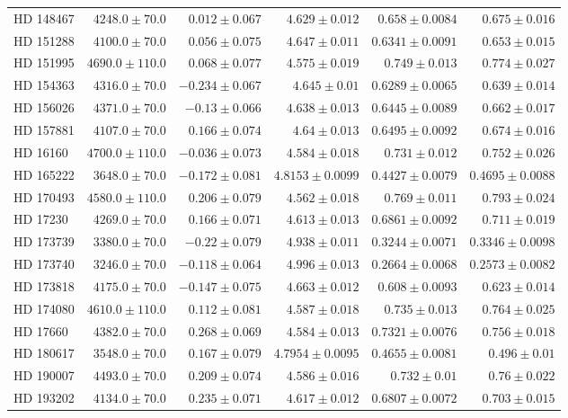 \begin{longtable*}{lrrrrr}
HD 148467 & $4248.0\pm 70.0$ & $0.012\pm 0.067$ & $4.629\pm 0.012$ & $0.658\pm 0.0084$ & $0.675\pm 0.016$ \\ 
HD 151288 & $4100.0\pm 70.0$ & $0.056\pm 0.075$ & $4.647\pm 0.011$ & $0.6341\pm 0.0091$ & $0.653\pm 0.015$ \\ 
HD 151995 & $4690.0\pm 110.0$ & $0.068\pm 0.077$ & $4.575\pm 0.019$ & $0.749\pm 0.013$ & $0.774\pm 0.027$ \\ 
HD 154363 & $4316.0\pm 70.0$ & $-0.234\pm 0.067$ & $4.645\pm 0.01$ & $0.6289\pm 0.0065$ & $0.639\pm 0.014$ \\ 
HD 156026 & $4371.0\pm 70.0$ & $-0.13\pm 0.066$ & $4.638\pm 0.013$ & $0.6445\pm 0.0089$ & $0.662\pm 0.017$ \\ 
HD 157881 & $4107.0\pm 70.0$ & $0.166\pm 0.074$ & $4.64\pm 0.013$ & $0.6495\pm 0.0092$ & $0.674\pm 0.016$ \\ 
HD 16160 & $4700.0\pm 110.0$ & $-0.036\pm 0.073$ & $4.584\pm 0.018$ & $0.731\pm 0.012$ & $0.752\pm 0.026$ \\ 
HD 165222 & $3648.0\pm 70.0$ & $-0.172\pm 0.081$ & $4.8153\pm 0.0099$ & $0.4427\pm 0.0079$ & $0.4695\pm 0.0088$ \\ 
HD 170493 & $4580.0\pm 110.0$ & $0.206\pm 0.079$ & $4.562\pm 0.018$ & $0.769\pm 0.011$ & $0.793\pm 0.024$ \\ 
HD 17230 & $4269.0\pm 70.0$ & $0.166\pm 0.071$ & $4.613\pm 0.013$ & $0.6861\pm 0.0092$ & $0.711\pm 0.019$ \\ 
HD 173739 & $3380.0\pm 70.0$ & $-0.22\pm 0.079$ & $4.938\pm 0.011$ & $0.3244\pm 0.0071$ & $0.3346\pm 0.0098$ \\ 
HD 173740 & $3246.0\pm 70.0$ & $-0.118\pm 0.064$ & $4.996\pm 0.013$ & $0.2664\pm 0.0068$ & $0.2573\pm 0.0082$ \\ 
HD 173818 & $4175.0\pm 70.0$ & $-0.147\pm 0.075$ & $4.663\pm 0.012$ & $0.608\pm 0.0093$ & $0.623\pm 0.014$ \\ 
HD 174080 & $4610.0\pm 110.0$ & $0.112\pm 0.081$ & $4.587\pm 0.018$ & $0.735\pm 0.013$ & $0.764\pm 0.025$ \\ 
HD 17660 & $4382.0\pm 70.0$ & $0.268\pm 0.069$ & $4.584\pm 0.013$ & $0.7321\pm 0.0076$ & $0.756\pm 0.018$ \\ 
HD 180617 & $3548.0\pm 70.0$ & $0.167\pm 0.079$ & $4.7954\pm 0.0095$ & $0.4655\pm 0.0081$ & $0.496\pm 0.01$ \\ 
HD 190007 & $4493.0\pm 70.0$ & $0.209\pm 0.074$ & $4.586\pm 0.016$ & $0.732\pm 0.01$ & $0.76\pm 0.022$ \\ 
HD 193202 & $4134.0\pm 70.0$ & $0.235\pm 0.071$ & $4.617\pm 0.012$ & $0.6807\pm 0.0072$ & $0.703\pm 0.015$ \\ 

\end{longtable*}
